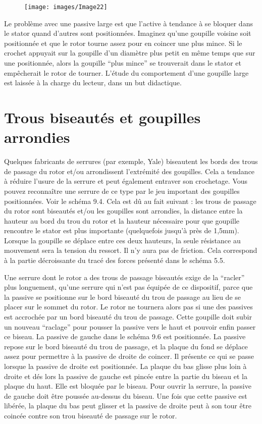 \documentclass[a4paper,french,11pt,twoside]{report}
\begin{document}
\begin{figure}[ht] \begin{center}
        \texttt{[image: images/Image22]}
        \caption{}
\end{center} \end{figure}

Le problème avec une passive large est que l'active à tendance à se bloquer dans le stator quand d'autres sont positionnées. Imaginez qu'une goupille voisine soit positionnée et que le rotor tourne assez pour en coincer une plus mince. Si le crochet appuyait sur la goupille d'un diamètre plus petit en même temps que sur une positionnée, alors la goupille \enquote{plus mince} se trouverait dans le stator et empêcherait le rotor de tourner. L'étude du comportement d'une goupille large est laissée à la charge du lecteur, dans un but didactique.

\section{Trous biseautés et goupilles arrondies}

Quelques fabricants de serrures (par exemple, Yale) biseautent les bords des trous de passage du rotor et/ou arrondissent l'extrémité des goupilles. Cela a tendance à réduire l'usure de la serrure et peut également entraver son crochetage. Vous pouvez reconnaître une serrure de ce type par le jeu important des goupilles positionnées. Voir le schéma 9.4. Cela est dû au fait suivant : les trous de passage du rotor sont biseautés et/ou les goupilles sont arrondies, la distance entre la hauteur au bord du trou du rotor et la hauteur nécessaire pour que goupille rencontre le stator est plus importante (quelquefois jusqu'à près de 1,5mm). Lorsque la goupille se déplace entre ces deux hauteurs, la seule résistance au mouvement sera la tension du ressort. Il n'y aura pas de friction. Cela correspond à la partie décroissante du tracé des forces présenté dans le schéma 5.5.

Une serrure dont le rotor a des trous de passage biseautés exige de la \enquote{racler} plus longuement, qu'une serrure qui n'est pas équipée de ce dispositif, parce que la passive se positionne sur le bord biseauté du trou de passage au lieu de se placer sur le sommet du rotor. Le rotor ne tournera alors pas si une des passives est accrochée par un bord biseauté du trou de passage. Cette goupille doit subir un nouveau \enquote{raclage} pour pousser la passive vers le haut et pouvoir enfin passer ce biseau. La passive de gauche dans le schéma 9.6 est positionnée. La passive repose sur le bord biseauté du trou de passage, et la plaque du fond se déplace assez pour permettre à la passive de droite de coincer. Il présente ce qui se passe lorsque la passive de droite est positionnée. La plaque du bas glisse plus loin à droite et dés lors la passive de gauche est pincée entre la partie du biseau et la plaque du haut. Elle est bloquée par le biseau. Pour ouvrir la serrure, la passive de gauche doit être poussée au-dessus du biseau. Une fois que cette passive est libérée, la plaque du bas peut glisser et la passive de droite peut à son tour être coincée contre son trou biseauté de passage sur le rotor.
\end{document}
